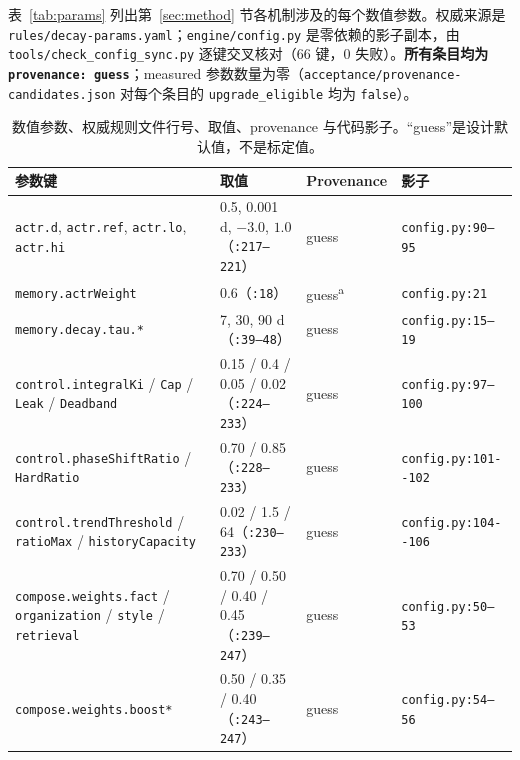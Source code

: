表~\ref{tab:params} 列出第~\ref{sec:method} 节各机制涉及的每个数值参数。权威来源是 \texttt{rules/\allowbreak{}decay-\allowbreak{}params.\allowbreak{}yaml}；\texttt{engine/config.py} 是零依赖的影子副本，由 \texttt{tools/\allowbreak{}check\_\allowbreak{}config\_\allowbreak{}sync.\allowbreak{}py} 逐键交叉核对（66 键，0 失败）。\textbf{所有条目均为 \texttt{provenance: guess}}；measured 参数数量为零（\texttt{acceptance/\allowbreak{}provenance-\allowbreak{}candidates.\allowbreak{}json} 对每个条目的 \texttt{upgrade\_eligible} 均为 \texttt{false}）。

\begin{table}[t]
\centering\scriptsize\setlength{\tabcolsep}{2.5pt}
\caption{数值参数、权威规则文件行号、取值、provenance 与代码影子。“guess”是设计默认值，不是标定值。}
\begin{tabular}{@{}p{}p{}p{}p{}@{}}
\toprule
参数键 & 取值 & Provenance & 影子 \\
\midrule
\texttt{actr.d}, \texttt{actr.ref}, \texttt{actr.lo}, \texttt{actr.hi} & 0.5, 0.001 d, $-3.0$, $1.0$（\texttt{:217--221}） & guess & \texttt{config.py:90--95} \\
\texttt{memory.actrWeight} & 0.6（\texttt{:18}） & guess\textsuperscript{a} & \texttt{config.py:21} \\
\texttt{memory.\allowbreak{}decay.\allowbreak{}tau.\allowbreak{}*} & 7, 30, 90 d（\texttt{:39--48}） & guess & \texttt{config.py:15--19} \\
\texttt{control.\allowbreak{}integralKi} / \texttt{Cap} / \texttt{Leak} / \texttt{Deadband} & 0.15 / 0.4 / 0.05 / 0.02（\texttt{:224--233}） & guess & \texttt{config.py:97--100} \\
\texttt{control.\allowbreak{}phaseShiftRatio} / \texttt{HardRatio} & 0.70 / 0.85（\texttt{:228--233}） & guess & \texttt{config.\allowbreak{}py:\allowbreak{}101-\allowbreak{}-\allowbreak{}102} \\
\texttt{control.\allowbreak{}trendThreshold} / \texttt{ratioMax} / \texttt{historyCapacity} & 0.02 / 1.5 / 64（\texttt{:230--233}） & guess & \texttt{config.\allowbreak{}py:\allowbreak{}104-\allowbreak{}-\allowbreak{}106} \\
\texttt{compose.\allowbreak{}weights.\allowbreak{}fact} / \texttt{organization} / \texttt{style} / \texttt{retrieval} & 0.70 / 0.50 / 0.40 / 0.45（\texttt{:239--247}） & guess & \texttt{config.py:50--53} \\
\texttt{compose.\allowbreak{}weights.\allowbreak{}boost*} & 0.50 / 0.35 / 0.40（\texttt{:243--247}） & guess & \texttt{config.py:54--56} \\

\end{tabular}
\end{table}
